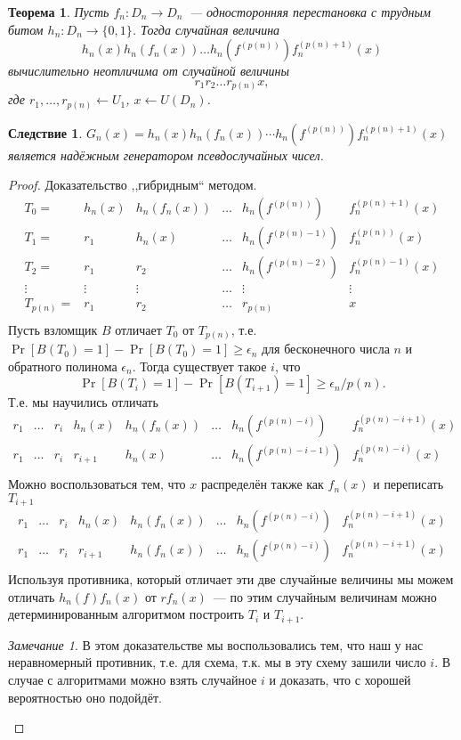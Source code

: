 \documentclass[12pt]{article}
\newcommand{\bits}{\{0,1\}}
\theoremstyle{definition}
\theoremstyle{plain}
\newtheorem{theorem}{Теорема}[section]
\newtheorem{corollary}{Следствие}[section]
\theoremstyle{remark}
\newtheorem{remark}{Замечание}[section]
\begin{document}
\begin{theorem}
Пусть $f_n:D_n\to D_n$~--- односторонняя перестановка с трудным битом $h_n: D_n\to\bits$.
Тогда случайная величина 
$$h_n(x)h_n(f_n(x))\dotsc h_n(f^{(p(n))})f_n^{(p(n) + 1)}(x)$$
вычислительно неотличима от случайной величины 
$$r_1r_2\dotsc r_{p(n)}x,$$
где $r_1,\dotsc,r_{p(n)}\gets U_1$, $x\gets U(D_n)$.
\end{theorem}
\begin{corollary}
$G_n(x) = h_n(x)h_n(f_n(x))\dotsb h_n(f^{(p(n))})f_n^{(p(n) + 1)}(x)$ является надёжным генератором псевдослучайных чисел.
\end{corollary}
\begin{proof}
Доказательство ,,гибридным`` методом.
$$
\begin{array}{llllll}
T_0 = & h_n(x)&h_n(f_n(x))&\dotsc  &h_n(f^{(p(n))})  &f_n^{(p(n) + 1)}(x)\\
T_1 = &r_1   &h_n(x)     &\dotsc  &h_n(f^{(p(n)-1)})&f_n^{(p(n))}(x)\\
T_2 = &r_1   &r_2        &\dotsc  &h_n(f^{(p(n)-2)})&f_n^{(p(n)-1)}(x)\\
\vdots   &\vdots&\vdots     &\dotsc  &\vdots			 &\vdots\\
T_{p(n)}= &r_1   &r_2        &\dotsc  &r_{p(n)}		 &x\\
\end{array}
$$
Пусть взломщик $B$ отличает $T_0$ от $T_{p(n)}$, т.е. $\Pr[B(T_0) = 1] - \Pr[B(T_0) = 1]\ge\epsilon_n$
для бесконечного числа $n$ и обратного полинома $\epsilon_n$. Тогда существует такое $i$, что
$$\Pr[B(T_i) = 1] - \Pr[B(T_{i+1}) = 1]\ge\epsilon_n/p(n).$$ Т.е. мы научились отличать
$$
\begin{array}{llllllll}
r_1   &\dotsc & r_i & h_n(x)  & h_n(f_n(x)) &\dotsc& h_n(f^{(p(n)-i)})    &f_n^{(p(n) - i + 1)}(x)\\
r_1   &\dotsc & r_i & r_{i+1} & h_n(x)      &\dotsc& h_n(f^{(p(n)-i - 1)})&f_n^{(p(n) - i)}(x)\\
\end{array}
$$
Можно воспользоваться тем, что $x$ распределён также как $f_n(x)$ и переписать $T_{i+1}$
$$
\begin{array}{llllllll}
r_1   &\dotsc & r_i & h_n(x)  & h_n(f_n(x)) &\dotsc& h_n(f^{(p(n)-i)}) &f_n^{(p(n) - i + 1)}(x)\\
r_1   &\dotsc & r_i & r_{i+1} & h_n(f_n(x)) &\dotsc& h_n(f^{(p(n)-i)}) &f_n^{(p(n) - i + 1)}(x)\\
\end{array}
$$
Используя противника, который отличает эти две случайные величины мы можем отличать $h_n(f)f_n(x)$ от $r f_n(x)$~---
по этим случайным величинам можно детерминированным алгоритмом построить $T_{i}$ и $T_{i+1}$.

\begin{remark}
В этом доказательстве мы воспользовались тем, что наш у нас неравномерный противник, т.е. для схема,
т.к. мы в эту схему зашили число $i$. В случае с алгоритмами можно взять случайное $i$ и доказать, 
что с хорошей вероятностью оно подойдёт.
\end{remark}
\end{proof}
\end{document}
